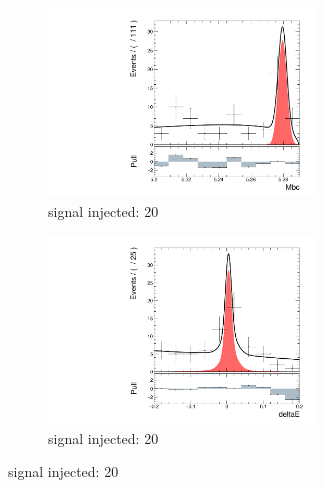 \begin{figure}[H]
	\ContinuedFloat
	\begin{subfigure}{0.5\linewidth}
		\includegraphics[page=1,height=5cm]{figures/injection_sig_20/ds_gen_Mbc_2D.pdf}
		\caption{signal injected: 20}
	\end{subfigure}
	\begin{subfigure}{0.5\linewidth}
		\includegraphics[page=1,height=5cm]{figures/injection_sig_20/ds_gen_deltaE_2D.pdf}
		\caption{signal injected: 20}
	\end{subfigure}
	

\end{figure}
